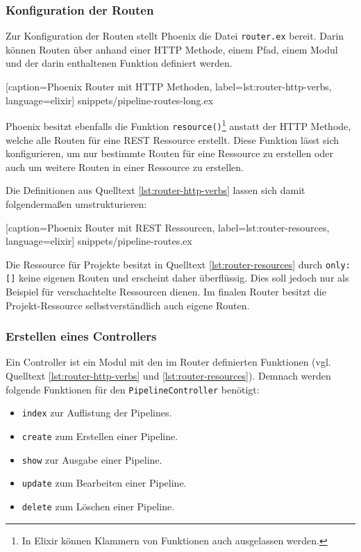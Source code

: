 \subsubsection{Konfiguration der Routen}

Zur Konfiguration der Routen stellt Phoenix die Datei \texttt{router.ex} bereit. Darin können Routen über anhand einer HTTP Methode, einem Pfad, einem Modul und der darin enthaltenen Funktion definiert werden.


  [caption={Phoenix Router mit HTTP Methoden},
  label={lst:router-http-verbs},
  language=elixir]
  {snippets/pipeline-routes-long.ex}

Phoenix besitzt ebenfalls die Funktion \texttt{resource()}\footnote{In Elixir können Klammern von Funktionen auch ausgelassen werden.} anstatt der HTTP Methode, welche alle Routen für eine REST Ressource erstellt. Diese Funktion lässt sich konfigurieren, um nur bestimmte Routen für eine Ressource zu erstellen oder auch um weitere Routen in einer Ressource zu erstellen.

Die Definitionen aus Quelltext \ref{lst:router-http-verbs} lassen sich damit folgendermaßen umstrukturieren:


  [caption={Phoenix Router mit REST Ressourcen},
  label={lst:router-resources},
  language=elixir]
  {snippets/pipeline-routes.ex}

Die Ressource für Projekte besitzt in Quelltext \ref{lst:router-resources} durch \texttt{only: []} keine eigenen Routen und erscheint daher überflüssig. Dies soll jedoch nur als Beispiel für verschachtelte Ressourcen dienen. Im finalen Router besitzt die Projekt-Ressource selbstverständlich auch eigene Routen.

\subsubsection{Erstellen eines Controllers}

Ein Controller ist ein Modul mit den im Router definierten Funktionen (vgl. Quelltext \ref{lst:router-http-verbs} und \ref{lst:router-resources}). Demnach werden folgende Funktionen für den \texttt{PipelineController} benötigt:

\begin{itemize}
  \item \texttt{index} zur Auflistung der Pipelines.
  \item \texttt{create} zum Erstellen einer Pipeline.
  \item \texttt{show} zur Ausgabe einer Pipeline.
  \item \texttt{update} zum Bearbeiten einer Pipeline.
  \item \texttt{delete} zum Löschen einer Pipeline.
\end{itemize}

